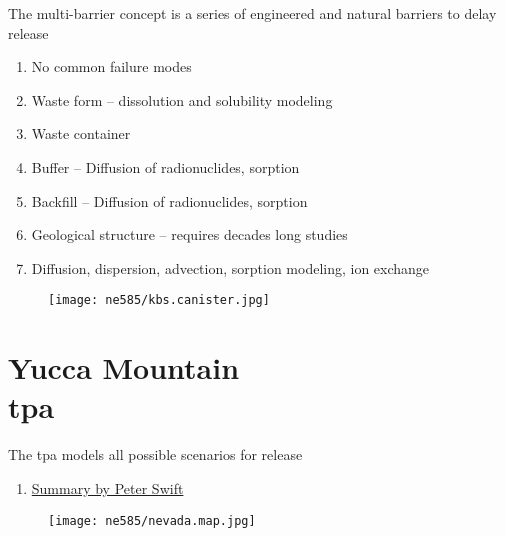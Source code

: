 \documentclass[aspectratio=1610,pdftex,dvipsnames,compress,xcolor={dvipsnames}]{beamer}
\newcommand{\acf}{\acrfull} %
\newcommand{\acs}{\acrshort} %
\begin{document}
\begin{frame}{The multi-barrier concept is a series of engineered and natural barriers to delay release}
    \begin{enumerate}[series=outerlist,topsep=0pt,itemsep=21pt,leftmargin=*,label=(\arabic*)]
        \item[]No common failure modes
        \item[]Waste form -- dissolution and solubility modeling
        \item[]Waste container
        \item[]Buffer -- Diffusion of radionuclides, sorption
        \item[]Backfill -- Diffusion of radionuclides, sorption
        \item[]Geological structure -- requires decades long studies
        \item[]Diffusion, dispersion, advection, sorption modeling, ion exchange
    \end{enumerate}
\end{frame}


\begin{frame}{}
    \begin{figure}
        \centering
        \texttt{[image: ne585/kbs.canister.jpg]}
    \end{figure}
\end{frame}


\section{Yucca Mountain\\\acf{tpa}}


\addtocounter{framenumber}{-1} 
\begin{frame}{The \acs{tpa} models all possible scenarios for release }
    \begin{enumerate}[resume=blue,topsep=0pt,itemsep=21pt,leftmargin=*,label=(\arabic*)]
        \item[]\href{https://www.osti.gov/servlets/purl/1142603}{Summary by Peter Swift}
    \end{enumerate}
\end{frame}


\begin{frame}{}
    \begin{figure}
        \centering
        \texttt{[image: ne585/nevada.map.jpg]}
    \end{figure}
\end{frame}
\end{document}
